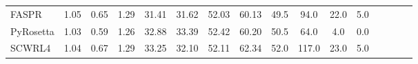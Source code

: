 \begin{table}
{\begin{tabular}{@{}lccccccccccccccc@{}}
                \textnormal{\hspace{0.5cm}FASPR} & 1.05 & 0.65 & 1.29 & 31.41 & 31.62 & 52.03 & 60.13 & 49.5 & 94.0 & 22.0 & 5.0 \\
                \textnormal{\hspace{0.5cm}PyRosetta} & 1.03 & 0.59 & 1.26 & 32.88 & 33.39 & 52.42 & 60.20 & 50.5 & 64.0 & 4.0 & 0.0 \\
                \textnormal{\hspace{0.5cm}SCWRL4} & 1.04 & 0.67 & 1.29 & 33.25 & 32.10 & 52.11 & 62.34 & 52.0 & 117.0 & 23.0 & 5.0 \\
            \bottomrule
        \end{tabular}
    }
    \label{tab:casp15_data_table}
\end{table}
